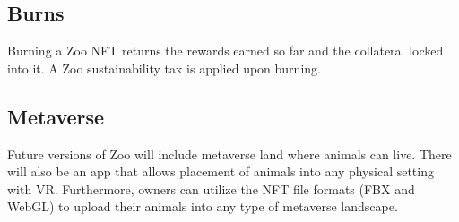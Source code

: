\subsection{Burns}
Burning a Zoo NFT returns the rewards earned so far and the collateral locked into it. A Zoo sustainability tax is applied upon burning.

\subsection{Metaverse}
Future versions of Zoo will include metaverse land where animals can live. There will also be an app that allows placement of animals into any physical setting with VR. Furthermore, owners can utilize the NFT file formats (FBX and WebGL) to upload their animals into any type of metaverse landscape.
